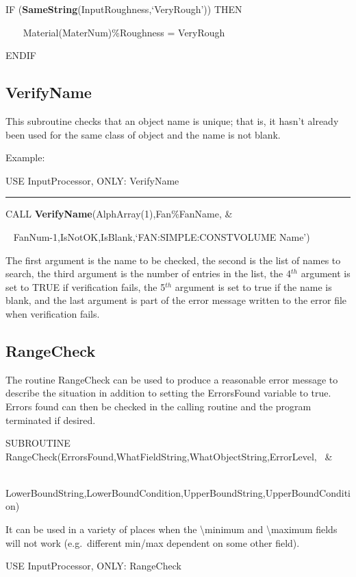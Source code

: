 IF (\textbf{SameString}(InputRoughness,`VeryRough')) THEN

~~~ Material(MaterNum)\%Roughness = VeryRough

ENDIF

\subsection{VerifyName}\label{verifyname}

This subroutine checks that an object name is unique; that is, it hasn't already been used for the same class of object and the name is not blank.

Example:

USE InputProcessor, ONLY: VerifyName

\begin{center}\rule{0.5\linewidth}{\linethickness}\end{center}

CALL \textbf{VerifyName}(AlphArray(1),Fan\%FanName, \&

~ FanNum-1,IsNotOK,IsBlank,`FAN:SIMPLE:CONSTVOLUME Name')

The first argument is the name to be checked, the second is the list of names to search, the third argument is the number of entries in the list, the 4\(^{th}\) argument is set to TRUE if verification fails, the 5\(^{th}\) argument is set to true if the name is blank, and the last argument is part of the error message written to the error file when verification fails.

\subsection{RangeCheck}\label{rangecheck}

The routine RangeCheck can be used to produce a reasonable error message to describe the situation in addition to setting the ErrorsFound variable to true.~ Errors found can then be checked in the calling routine and the program terminated if desired.

SUBROUTINE RangeCheck(ErrorsFound,WhatFieldString,WhatObjectString,ErrorLevel,~ \&

~~~~~~~~~~~~~~~~~~~~~ LowerBoundString,LowerBoundCondition,UpperBoundString,UpperBoundCondition)

It can be used in a variety of places when the \textbackslash{}minimum and \textbackslash{}maximum fields will not work (e.g.~different min/max dependent on some other field).

USE InputProcessor, ONLY: RangeCheck

